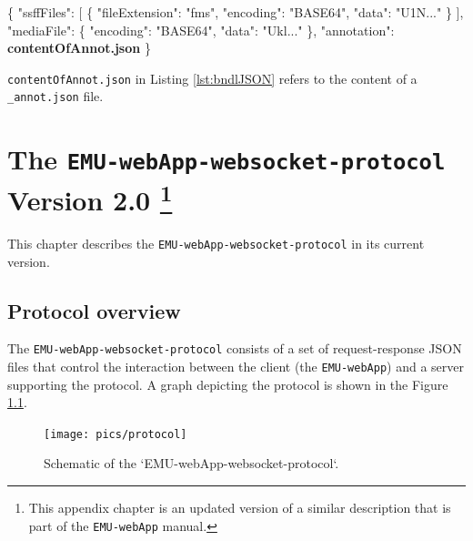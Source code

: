 \documentclass[]{book}
\newenvironment{Shaded}{\begin{snugshade}}{\end{snugshade}}
\newcommand{\DataTypeTok}[1]{\textcolor[rgb]{0.13,0.29,0.53}{#1}}
\newcommand{\ErrorTok}[1]{\textcolor[rgb]{0.64,0.00,0.00}{\textbf{#1}}}
\newcommand{\FunctionTok}[1]{\textcolor[rgb]{0.00,0.00,0.00}{#1}}
\newcommand{\OtherTok}[1]{\textcolor[rgb]{0.56,0.35,0.01}{#1}}
\newcommand{\StringTok}[1]{\textcolor[rgb]{0.31,0.60,0.02}{#1}}
\let\rmarkdownfootnote\footnote%
\def\footnote{\protect\rmarkdownfootnote}
\begin{document}
\begin{Shaded}
\begin{Highlighting}[]
\FunctionTok{\{}
 \DataTypeTok{"ssffFiles"}\FunctionTok{:} \OtherTok{[}
  \FunctionTok{\{}
   \DataTypeTok{"fileExtension"}\FunctionTok{:} \StringTok{"fms"}\FunctionTok{,}
   \DataTypeTok{"encoding"}\FunctionTok{:} \StringTok{"BASE64"}\FunctionTok{,}
   \DataTypeTok{"data"}\FunctionTok{:} \StringTok{"U1N..."}
  \FunctionTok{\}}
 \OtherTok{]}\FunctionTok{,}
 \DataTypeTok{"mediaFile"}\FunctionTok{:} \FunctionTok{\{}
  \DataTypeTok{"encoding"}\FunctionTok{:} \StringTok{"BASE64"}\FunctionTok{,}
  \DataTypeTok{"data"}\FunctionTok{:} \StringTok{"Ukl..."}
 \FunctionTok{\},}
 \DataTypeTok{"annotation"}\FunctionTok{:} \ErrorTok{contentOfAnnot.json}
\FunctionTok{\}}
\end{Highlighting}
\end{Shaded}

\texttt{contentOfAnnot.json} in Listing \ref{lst:bndlJSON} refers to the content of a \texttt{\_annot.json} file.

\hypertarget{app-chap:wsProtocol}{%
\chapter[The \texttt{EMU-webApp-websocket-protocol} Version 2.0 ]{\texorpdfstring{The \texttt{EMU-webApp-websocket-protocol} Version 2.0 \footnote{This appendix chapter is an updated version of a similar description that is part of the \texttt{EMU-webApp} manual.}}{The EMU-webApp-websocket-protocol Version 2.0 }}\label{app-chap:wsProtocol}}

This chapter describes the \texttt{EMU-webApp-websocket-protocol} in its current version.

\hypertarget{protocol-overview}{%
\section{Protocol overview}\label{protocol-overview}}

The \texttt{EMU-webApp-websocket-protocol} consists of a set of request-response JSON files that control the interaction between the client (the \texttt{EMU-webApp}) and a server supporting the protocol. A graph depicting the protocol is shown in the Figure \ref{fig:app-chapWsProtocolGraph}.

\begin{figure}

{\centering \texttt{[image: pics/protocol]} 

}

\caption{Schematic of the `EMU-webApp-websocket-protocol`.}\label{fig:app-chapWsProtocolGraph}
\end{figure}
\end{document}
